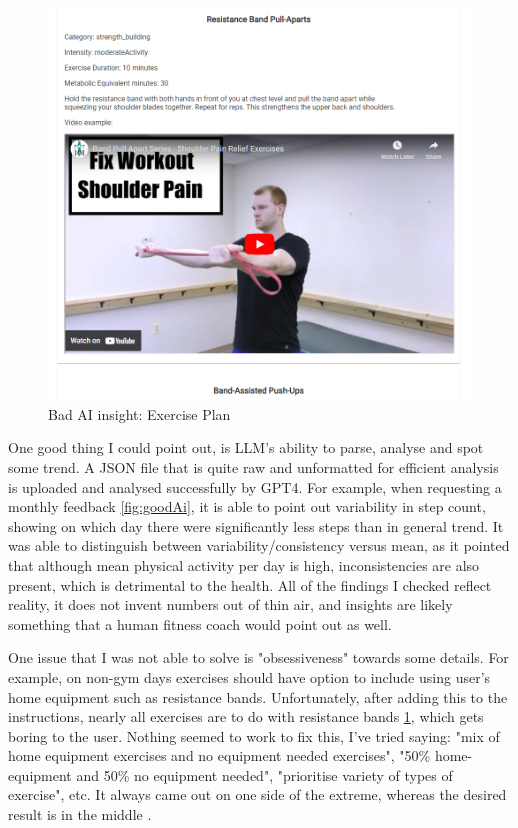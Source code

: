 \begin{figure}
    
    \centering
    \includegraphics[width=1\textwidth,keepaspectratio]{../images/BadAi.png}
    \caption{Bad AI insight: Exercise Plan}
    \label{fig:badAi}
    
\end{figure}

One good thing I could point out, is LLM's ability to parse, analyse and spot some trend. A JSON file that is quite raw and unformatted for efficient analysis is uploaded and analysed successfully by GPT4. For example, when requesting a monthly feedback \ref{fig:goodAi}, it is able to point out variability in step count, showing on which day there were significantly less steps than in general trend. It was able to distinguish between variability/consistency versus mean, as it pointed that although mean physical activity per day is high, inconsistencies are also present, which is detrimental to the health. All of the findings I checked reflect reality, it does not invent numbers out of thin air, and insights are likely something that a human fitness coach would point out as well. 

One issue that I was not able to solve is "obsessiveness" towards some details. For example, on non-gym days exercises should have option to include using user's home equipment such as resistance bands. Unfortunately, after adding this to the instructions, nearly all exercises are to do with resistance bands \ref{fig:badAi}, which gets boring to the user. Nothing seemed to work to fix this, I've tried saying: "mix of home equipment exercises and no equipment needed exercises", "50\% home-equipment and 50\% no equipment needed", "prioritise variety of types of exercise", etc. It always came out on one side of the extreme, whereas the desired result is in the middle . 

